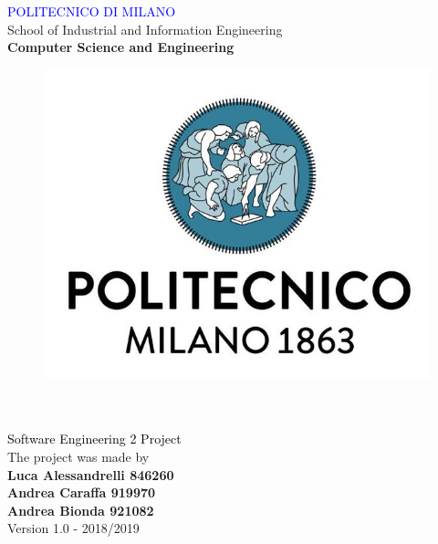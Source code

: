
\usepackage[dvipsnames]{xcolor}
\usepackage{listings}
\usepackage{placeins}
\usepackage{graphicx,color,listings}
\usepackage{float}
\usepackage[export]{adjustbox}
\usepackage{hyperref}%
\hypersetup{%
  colorlinks = true,
  linkcolor  = black
}
\usepackage{sectsty}
\usepackage{enumitem}
\usepackage[english]{babel}
\usepackage{booktabs}
\usepackage{xcolor}


\sectionfont{\huge}
\subsectionfont{\LARGE}
\subsubsectionfont{\Large}








\begin{titlepage}

\centering
{\textcolor{Blue}{\LARGE  {POLITECNICO DI MILANO}}}\\[0.5CM]
\Large {School of Industrial and Information Engineering}\\[0.3CM]
\textbf{\Large Computer Science and Engineering}\\
[1cm]
\begin{figure}[H]
\centering
\includegraphics[scale = 0.3]{Images/Logo/logo.jpg}\\
[1cm]
\end{figure}
{\fontsize{35}{35} }\\[0.5cm]
{\fontsize{25}{70} }\\[0.5cm]     
{\textcolor{Black}{\LARGE{Software Engineering 2 Project}}}\\ [2cm]     
\centering
The project was made by\\[0.5cm]
\textbf {\LARGE Luca Alessandrelli 846260}\\[0.2cm]
\textbf {\LARGE Andrea Caraffa 919970}\\[0.2cm]
\textbf {\LARGE Andrea Bionda 921082}\\[0.5cm]
Version 1.0  -  2018/2019
\end{titlepage}

